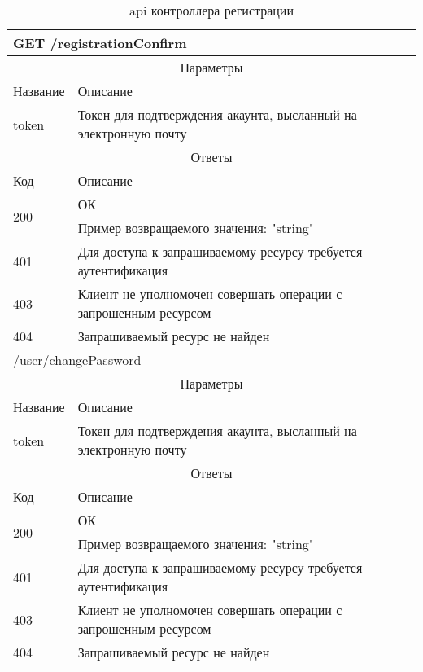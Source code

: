 \begin{table}[H]
  \caption{api контроллера регистрации}\label{use-case-15-table}
  \begin{tabular}{|p{6cm}|p{10cm}|}
  \hline \multicolumn{2}{|l|}{GET /registrationConfirm} \\
  \hline \multicolumn{2}{|c|}{Параметры} \\
  \hline Название & Описание \\
  \hline token & Токен для подтверждения акаунта, высланный на электронную почту \\
  \hline \multicolumn{2}{|c|}{Ответы} \\
  \hline Код & Описание \\
  \hline \multirow{2}{=}{200} & ОК \\
   & Пример возвращаемого значения: "string" \\
  \hline 401 & Для доступа к запрашиваемому ресурсу требуется аутентификация \\
  \hline 403 & Клиент не уполномочен совершать операции с запрошенным ресурсом \\
  \hline 404 & Запрашиваемый ресурс не найден \\
  \hline \multicolumn{2}{|l|}{/user/changePassword} \\
  \hline \multicolumn{2}{|c|}{Параметры} \\
  \hline Название & Описание \\
  \hline token & Токен для подтверждения акаунта, высланный на электронную почту \\
  \hline \multicolumn{2}{|c|}{Ответы} \\
  \hline Код & Описание \\
  \hline \multirow{2}{=}{200} & ОК \\
   & Пример возвращаемого значения: "string" \\
  \hline 401 & Для доступа к запрашиваемому ресурсу требуется аутентификация \\
  \hline 403 & Клиент не уполномочен совершать операции с запрошенным ресурсом \\
  \hline 404 & Запрашиваемый ресурс не найден \\
  \hline
  \end{tabular}
\end{table}



\clearpage
